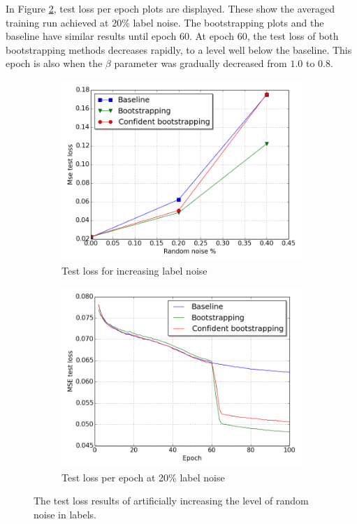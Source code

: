In Figure \ref{fig:app_E8_lc}, test loss per epoch plots are displayed. These show the averaged training run achieved at 20\% label noise. The bootstrapping plots and the baseline have similar results until epoch 60. At epoch 60, the test loss of both bootstrapping methods decreases rapidly, to a level well below the baseline. This epoch is also when the $\beta$ parameter was gradually decreased from $1.0$ to $0.8$.
\begin{figure}
\begin{subfigure}{0.5\textwidth}
\includegraphics[width=\linewidth]{figs/E8/summary.png}
\caption{Test loss for increasing label noise} \label{fig:app_E8_summary}
\end{subfigure}
\hspace*{\fill} %
\begin{subfigure}{0.5\textwidth}
\includegraphics[width=\linewidth]{figs/E8/lc.png}
\caption{Test loss per epoch at 20\% label noise} \label{fig:app_E8_lc}
\end{subfigure}
\caption[Label flipping results]{The test loss results of artificially increasing the level of random noise in labels.}
\label{fig:app_E8}
\end{figure}
